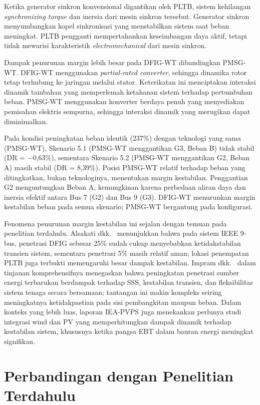Ketika generator sinkron konvensional digantikan oleh PLTB, sistem kehilangan
\textit{synchronizing torque} dan inersia dari mesin sinkron tersebut. Generator
sinkron menyumbangkan kopel sinkronisasi yang menstabilkan sistem saat beban
meningkat. PLTB pengganti mempertahankan keseimbangan daya aktif, tetapi tidak
mewarisi karakteristik \textit{electromechanical} dari mesin sinkron.

Dampak penurunan margin lebih besar pada DFIG-WT dibandingkan PMSG-WT. DFIG-WT
menggunakan \textit{partial-rated converter}, sehingga dinamika rotor tetap
terhubung ke jaringan melalui stator. Keterikatan ini menciptakan interaksi
dinamik tambahan yang memperlemah ketahanan sistem terhadap pertumbuhan beban.
PMSG-WT menggunakan konverter berdaya penuh yang menyediakan pemisahan elektris
sempurna, sehingga interaksi dinamik yang merugikan dapat diminimalkan.

Pada kondisi peningkatan beban identik (237\%) dengan teknologi yang sama
(PMSG-WT), Skenario 5.1 (PMSG-WT menggantikan G3, Beban B) tidak stabil
(DR = $-$0,63\%), sementara Skenario 5.2 (PMSG-WT menggantikan G2, Beban A)
masih stabil (DR = 8,39\%). Posisi PMSG-WT relatif terhadap beban yang
ditingkatkan, bukan teknologinya, menentukan margin kestabilan. Penggantian G2
menguntungkan Beban A, kemungkinan karena perbedaan aliran daya dan inersia
efektif antara Bus 7 (G2) dan Bus 9 (G3). DFIG-WT menurunkan margin kestabilan
beban pada semua skenario; PMSG-WT bergantung pada konfigurasi.

Fenomena penurunan margin kestabilan ini sejalan dengan temuan pada penelitian
terdahulu. Alsakati dkk.\ \cite{alsakati2021} menunjukkan bahwa pada sistem
IEEE 9-bus, penetrasi DFIG sebesar 25\% sudah cukup menyebabkan ketidakstabilan
transien sistem, sementara penetrasi 5\% masih relatif aman; lokasi penempatan
PLTB juga terbukti memengaruhi besar dampak kestabilan. Impram dkk.\
\cite{impram2020} dalam tinjauan komprehensifnya menegaskan bahwa peningkatan
penetrasi sumber energi terbarukan berdampak terhadap SSS, kestabilan transien,
dan fleksibilitas sistem tenaga secara bersamaan; tantangan ini makin kompleks
seiring meningkatnya ketidakpastian pada sisi pembangkitan maupun beban. Dalam
konteks yang lebih luas, laporan IEA-PVPS \cite{ieapvps2024} juga menekankan
perlunya studi integrasi wind dan PV yang memperhitungkan dampak dinamik terhadap
kestabilan sistem, khususnya ketika pangsa EBT dalam bauran energi meningkat
signifikan.

\section{Perbandingan dengan Penelitian Terdahulu}

